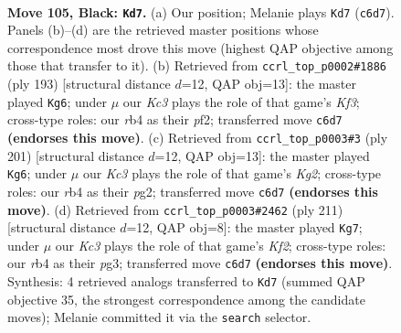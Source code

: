 \documentclass[11pt]{article}
\begin{document}
\clearpage

\begin{figure}[p]\centering
\begin{subfigure}{0.46\textwidth}\centering
\resizebox{\linewidth}{!}{%
\newchessgame
\chessboard[
  setfen={r7/8/2k1p1R1/8/1R2PP2/8/8/5K2 b - - 2 105},
  showmover=false,
  pgfstyle=straightmove, color=movearrow, markmove={c6-d7}
]}
\caption{}
\end{subfigure}\hfill
\begin{subfigure}{0.46\textwidth}\centering
\resizebox{\linewidth}{!}{%
\newchessgame
\chessboard[
  setfen={8/8/5k2/3R2p1/6P1/8/5PK1/r7 b - - 24 97},
  showmover=false,
  pgfstyle=straightmove, color=movearrow, markmove={f6-g6}
]}
\caption{}
\end{subfigure}
\\[4pt]
\begin{subfigure}{0.46\textwidth}\centering
\resizebox{\linewidth}{!}{%
\newchessgame
\chessboard[
  setfen={8/6k1/8/4R2p/7P/2r5/6PK/8 b - - 12 101},
  showmover=false,
  pgfstyle=straightmove, color=movearrow, markmove={g7-g6}
]}
\caption{}
\end{subfigure}\hfill
\begin{subfigure}{0.46\textwidth}\centering
\resizebox{\linewidth}{!}{%
\newchessgame
\chessboard[
  setfen={8/5k2/1R5p/8/5P2/6PK/8/2r5 b - - 28 106},
  showmover=false,
  pgfstyle=straightmove, color=movearrow, markmove={f7-g7}
]}
\caption{}
\end{subfigure}
\caption{\textbf{Move 105, Black: \texttt{Kd7}.} (a) Our position; Melanie plays \texttt{Kd7} (\texttt{c6d7}). Panels (b)--(d) are the retrieved master positions whose correspondence most drove this move (highest QAP objective among those that transfer to it). (b) Retrieved from \texttt{ccrl\_top\_p0002\#1886} (ply 193) [structural distance $d$=12, QAP obj=13]: the master played \texttt{Kg6}; under $\mu$ our \emph{Kc3} plays the role of that game's \emph{Kf3}; cross-type roles: our \emph{r}b4 as their \emph{p}f2; transferred move \texttt{c6d7} \textbf{(endorses this move)}. (c) Retrieved from \texttt{ccrl\_top\_p0003\#3} (ply 201) [structural distance $d$=12, QAP obj=13]: the master played \texttt{Kg6}; under $\mu$ our \emph{Kc3} plays the role of that game's \emph{Kg2}; cross-type roles: our \emph{r}b4 as their \emph{p}g2; transferred move \texttt{c6d7} \textbf{(endorses this move)}. (d) Retrieved from \texttt{ccrl\_top\_p0003\#2462} (ply 211) [structural distance $d$=12, QAP obj=8]: the master played \texttt{Kg7}; under $\mu$ our \emph{Kc3} plays the role of that game's \emph{Kf2}; cross-type roles: our \emph{r}b4 as their \emph{p}g3; transferred move \texttt{c6d7} \textbf{(endorses this move)}. Synthesis: 4 retrieved analogs transferred to \texttt{Kd7} (summed QAP objective 35, the strongest correspondence among the candidate moves); Melanie committed it via the \texttt{search} selector.}
\label{fig:thought-m209}
\end{figure}
\end{document}

